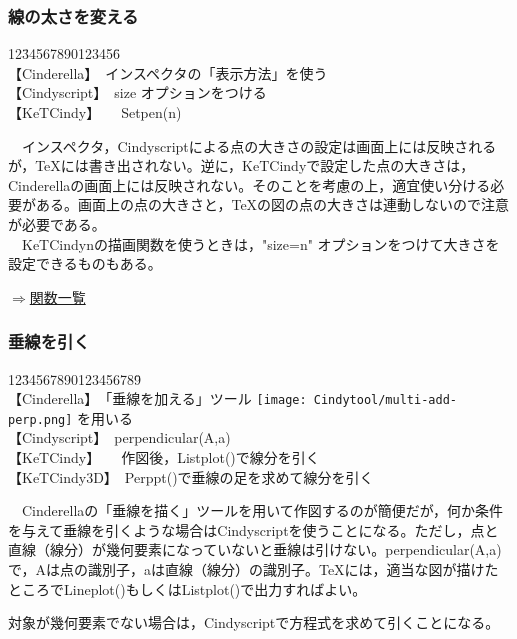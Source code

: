 \documentclass[papersize,a4paper,12pt,uplatex]{jsarticle}
\begin{document}
\subsubsection{線の太さを変える}
\begin{tabbing}
12\=34567890123456\=\kill\\

\>【Cinderella】　\>インスペクタの「表示方法」を使う\\ 
\>【Cindyscript】　\>size オプションをつける\\
 \>【KeTCindy】　　\>Setpen(n)　\\
\end{tabbing}
　インスペクタ，Cindyscriptによる点の大きさの設定は画面上には反映されるが，TeXには書き出されない。逆に，KeTCindyで設定した点の大きさは，Cinderellaの画面上には反映されない。そのことを考慮の上，適宜使い分ける必要がある。画面上の点の大きさと，TeXの図の点の大きさは連動しないので注意が必要である。\\
　KeTCindynの描画関数を使うときは，"size=n" オプションをつけて大きさを設定できるものもある。
\begin{flushright} \hyperlink{functionlist3d}{$\Rightarrow$関数一覧}\end{flushright}


\subsubsection{垂線を引く}

\begin{tabbing}
12\=34567890123456789\=\kill\\

\>【Cinderella】　\>「垂線を加える」ツール \texttt{[image: Cindytool/multi-add-perp.png]} を用いる　\\ 
\>【Cindyscript】　\>perpendicular(A,a)\\
 \>【KeTCindy】　　\>作図後，Listplot()で線分を引く\\
 \>【KeTCindy3D】　\>Perppt()で垂線の足を求めて線分を引く\\

\end{tabbing}
　Cinderellaの「垂線を描く」ツールを用いて作図するのが簡便だが，何か条件を与えて垂線を引くような場合はCindyscriptを使うことになる。ただし，点と直線（線分）が幾何要素になっていないと垂線は引けない。perpendicular(A,a)　で，Aは点の識別子，aは直線（線分）の識別子。TeXには，適当な図が描けたところでLineplot()もしくはListplot()で出力すればよい。

対象が幾何要素でない場合は，Cindyscriptで方程式を求めて引くことになる。
\end{document}
